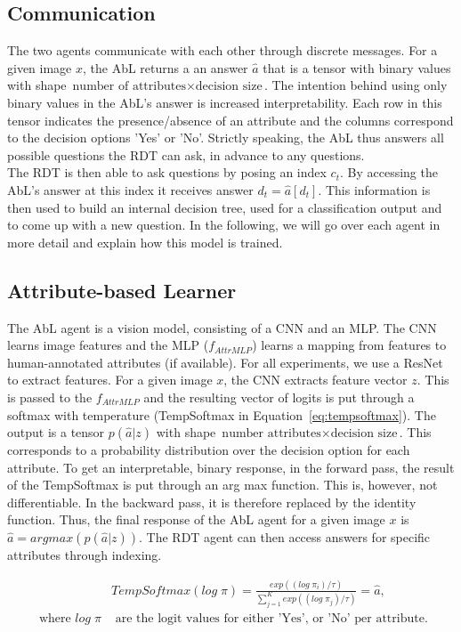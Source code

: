 \documentclass[a4paper,cleardoubleempty,BCOR1cm, 11pt]{report}
\begin{document}
\subsection{Communication}
The two agents communicate with each other through discrete messages. For a given image $x$, the AbL returns a an answer $\hat{a}$ that is a tensor with binary values with shape $\text{number of attributes} \times \text{decision size}$. The intention behind using only binary values in the AbL's answer is increased interpretability. Each row in this tensor indicates the presence/absence of an attribute and the columns correspond to the decision options 'Yes' or 'No'. Strictly speaking, the AbL thus answers all possible questions the RDT can ask, in advance to any questions.\\
The RDT is then able to ask questions by posing an index $c_t$. By accessing the AbL's answer at this index it receives answer $d_t = \hat{a}[d_t]$. This information is then used to build an internal decision tree, used for a classification output and to come up with a new question. In the following, we will go over each agent in more detail and explain how this model is trained.


\subsection{Attribute-based Learner}
The AbL agent is a vision model, consisting of a CNN and an MLP. The CNN learns image features and the MLP ($f_{AttrMLP}$) learns a mapping from features to human-annotated attributes (if available). For all experiments, we use a ResNet \cite{he2016deep} to extract features. For a given image $x$, the CNN extracts feature vector $z$. This is passed to the $f_{AttrMLP}$ and the resulting vector of logits is put through a softmax with temperature (TempSoftmax in Equation~\ref{eq:tempsoftmax}). The output is a tensor $p(\hat{a}|z)$ with shape $\text{number attributes} \times \text{decision size}$. This corresponds to a probability distribution over the decision option for each attribute. To get an interpretable, binary response, in the forward pass, the result of the TempSoftmax is put through an arg max function. This is, however, not differentiable. In the backward pass, it is therefore replaced by the identity function. Thus, the final response of the AbL agent for a given image $x$ is $\hat{a} = argmax(p(\hat{a}|z))$. The RDT agent can then access answers for specific attributes through indexing.

\begin{align}\label{eq:tempsoftmax}
&TempSoftmax(log\;\pi) = \frac{exp((log\;\pi_i)/\tau)}{\sum_{j=1}^{K}exp((log\;\pi_j)/\tau)} = \hat{a},\\
\text{ where }
log\;\pi &\text{ are the logit values for either 'Yes', or 'No' per attribute.}%
\end{align}
\end{document}
